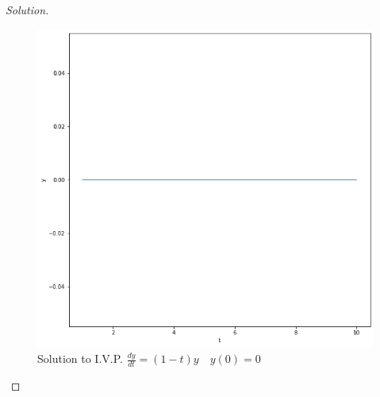 \documentclass{article}
\newenvironment{solution}
{\renewcommand\qedsymbol{$\blacksquare$}\begin{proof}[Solution]}{\end{proof}}
\begin{document}
\begin{solution}
\begin{figure}[H]
\caption{Solution to I.V.P. $\frac{dy}{dt} = (1-t)y \quad y(0) = 0$}
\centering
\includegraphics[width=1.0\textwidth]{solution}
\end{figure}

\end{solution}
\end{document}
